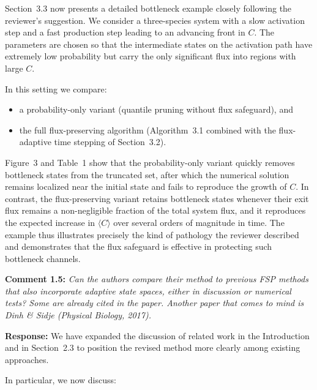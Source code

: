 \documentclass[11pt]{article}
\begin{document}
Section~3.3 now presents a detailed bottleneck example closely following the
reviewer’s suggestion. We consider a three-species system with a slow activation step
and a fast production step leading to an advancing front in $C$. The parameters are
chosen so that the intermediate states on the activation path have extremely low
probability but carry the only significant flux into regions with large $C$.

In this setting we compare:

\begin{itemize}
  \item a probability-only variant (quantile pruning without flux safeguard), and
  \item the full flux-preserving algorithm (Algorithm~3.1 combined with the
        flux-adaptive time stepping of Section~3.2).
\end{itemize}

Figure~3 and Table~1 show that the probability-only variant quickly removes
bottleneck states from the truncated set, after which the numerical solution remains
localized near the initial state and fails to reproduce the growth of $C$. In
contrast, the flux-preserving variant retains bottleneck states whenever their exit
flux remains a non-negligible fraction of the total system flux, and it reproduces
the expected increase in $\langle C\rangle$ over several orders of magnitude in time.
The example thus illustrates precisely the kind of pathology the reviewer described
and demonstrates that the flux safeguard is effective in protecting such bottleneck
channels.

\vspace{0.5em}

\noindent\textbf{Comment 1.5:} \textit{Can the authors compare their method to previous FSP methods that
also incorporate adaptive state spaces, either in discussion or numerical tests?
Some are already cited in the paper. Another paper that comes to mind is Dinh \&
Sidje (Physical Biology, 2017).}

\textbf{Response:} We have expanded the discussion of related work in the
Introduction and in Section~2.3 to position the revised method more clearly among
existing approaches.

In particular, we now discuss:
\end{document}
